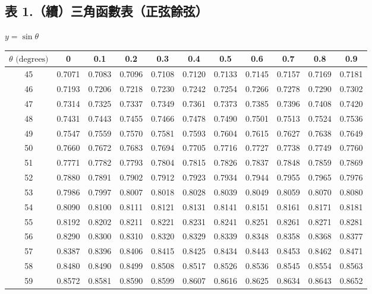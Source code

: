 \subsection*{表 1.\quad （續）三角函數表（正弦餘弦）}
\begin{center} $y = \sin\theta$ \end{center}
{\centering\fontsize{7.5pt}{8.6pt}\selectfont\setlength{\tabcolsep}{3.5pt}\renewcommand{\arraystretch}{0.88}
\begin{tabular}{|c|cccccccccc|}
\hline
$\theta\text{ (degrees)}$ & 0 & 0.1 & 0.2 & 0.3 & 0.4 & 0.5 & 0.6 & 0.7 & 0.8 & 0.9 \\ \hline
45 & 0.7071 & 0.7083 & 0.7096 & 0.7108 & 0.7120 & 0.7133 & 0.7145 & 0.7157 & 0.7169 & 0.7181 \\
46 & 0.7193 & 0.7206 & 0.7218 & 0.7230 & 0.7242 & 0.7254 & 0.7266 & 0.7278 & 0.7290 & 0.7302 \\
47 & 0.7314 & 0.7325 & 0.7337 & 0.7349 & 0.7361 & 0.7373 & 0.7385 & 0.7396 & 0.7408 & 0.7420 \\
48 & 0.7431 & 0.7443 & 0.7455 & 0.7466 & 0.7478 & 0.7490 & 0.7501 & 0.7513 & 0.7524 & 0.7536 \\
49 & 0.7547 & 0.7559 & 0.7570 & 0.7581 & 0.7593 & 0.7604 & 0.7615 & 0.7627 & 0.7638 & 0.7649 \\
\hline
50 & 0.7660 & 0.7672 & 0.7683 & 0.7694 & 0.7705 & 0.7716 & 0.7727 & 0.7738 & 0.7749 & 0.7760 \\
51 & 0.7771 & 0.7782 & 0.7793 & 0.7804 & 0.7815 & 0.7826 & 0.7837 & 0.7848 & 0.7859 & 0.7869 \\
52 & 0.7880 & 0.7891 & 0.7902 & 0.7912 & 0.7923 & 0.7934 & 0.7944 & 0.7955 & 0.7965 & 0.7976 \\
53 & 0.7986 & 0.7997 & 0.8007 & 0.8018 & 0.8028 & 0.8039 & 0.8049 & 0.8059 & 0.8070 & 0.8080 \\
54 & 0.8090 & 0.8100 & 0.8111 & 0.8121 & 0.8131 & 0.8141 & 0.8151 & 0.8161 & 0.8171 & 0.8181 \\
\hline
55 & 0.8192 & 0.8202 & 0.8211 & 0.8221 & 0.8231 & 0.8241 & 0.8251 & 0.8261 & 0.8271 & 0.8281 \\
56 & 0.8290 & 0.8300 & 0.8310 & 0.8320 & 0.8329 & 0.8339 & 0.8348 & 0.8358 & 0.8368 & 0.8377 \\
57 & 0.8387 & 0.8396 & 0.8406 & 0.8415 & 0.8425 & 0.8434 & 0.8443 & 0.8453 & 0.8462 & 0.8471 \\
58 & 0.8480 & 0.8490 & 0.8499 & 0.8508 & 0.8517 & 0.8526 & 0.8536 & 0.8545 & 0.8554 & 0.8563 \\
59 & 0.8572 & 0.8581 & 0.8590 & 0.8599 & 0.8607 & 0.8616 & 0.8625 & 0.8634 & 0.8643 & 0.8652 \\

\end{tabular}}
